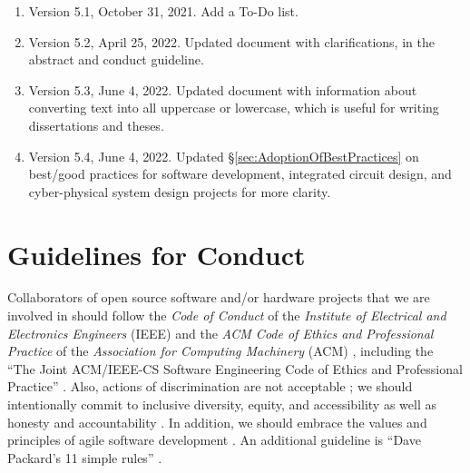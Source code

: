 \documentclass[letter,12pt]{article}
\begin{document}
\begin{enumerate}
\item Version 5.1, October 31, 2021. Add a To-Do list.
\item Version 5.2, April 25, 2022. Updated document with clarifications, in the abstract and conduct guideline.
\item Version 5.3, June 4, 2022. Updated document with information about converting text into all uppercase or lowercase, which is useful for writing dissertations and theses.
\item Version 5.4, June 4, 2022. Updated \S\ref{sec:AdoptionOfBestPractices} on best/good practices for software development, integrated circuit design, and cyber-physical system design projects for more clarity.
\end{enumerate}








\section{Guidelines for Conduct}
\label{sec:GuidelinesforConduct}



Collaborators of open source software and/or hardware projects that we are involved in should follow the {\it Code of Conduct} of the {\it Institute of Electrical and Electronics Engineers} (IEEE) \cite{IEEE2014b,IEEE2014a,IEEE2014} and the {\it ACM Code of Ethics and Professional Practice} of the {\it Association for Computing Machinery} (ACM) \cite{Gotterbarn2018b,Gotterbarn2018a,Gotterbarn2018,Brinkman2016a,ACMCouncil1992,Brinkman2017,Brinkman2016,Wolf2016,Anderson1993}, including the ``The Joint {ACM/IEEE-CS} Software Engineering Code of Ethics and Professional Practice'' \cite{Gotterbarn1999,Gotterbarn1997}. Also, actions of discrimination are not acceptable \cite{IEEE2014c}; we should intentionally commit to inclusive diversity, equity, and accessibility \cite{Rich2022} as well as honesty \cite{Oluo2019,Delgado2017b,McCord2017,Molinsky2017,Reiner2016,Sandberg2014,Chang2013a,Gini2013,Rees2013,Sandberg2013,Stoker2013,Hanson2011,Maxwell2010,Lafair2009,Brach2004,Peterson2004,Putnam2000,Carnegie1936} and accountability \cite{Eitel2020,Gladwell2019,Doerr2018,ACMPublicPolicyOfficeStaff2017,Gentry2016,Molinaro2016,Fitzgerald2015,Shapiro2015a,Boehm2014,Cloud2013,Rees2013,Gary2012,Connors2011,Cushing2010,Carbajal2008,Forest2007,Godin2006,Wessner2003,Christian2020,PartnershipOnAIStaff2020,Sabeti2018,Rheem2017,TINYhrIncStaff2015,Stephens2013,Parker2012}. In addition, we should embrace the values and principles of agile software development \cite{Beedle2001a,Carter2019,Pescio1997}. An additional guideline is ``Dave Packard's 11 simple rules'' \cite{HewlettPackardCompany2012}. \\
\end{document}
